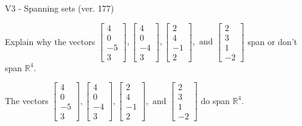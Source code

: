 \begin{exercise}
  \begin{exerciseTitle}V3 - Spanning sets (ver. 177)\end{exerciseTitle}
  \begin{exerciseStatement}
    Explain why the vectors \(\left[\begin{array}{r}
4 \\
0 \\
-5 \\
3
\end{array}\right] , \left[\begin{array}{r}
4 \\
0 \\
-4 \\
3
\end{array}\right] , \left[\begin{array}{r}
2 \\
4 \\
-1 \\
2
\end{array}\right] , \text{ and } \left[\begin{array}{r}
2 \\
3 \\
1 \\
-2
\end{array}\right]\) span or don't span \(\mathbb{R}^4\). 
	


  \end{exerciseStatement}
  \begin{exerciseAnswer}
   The vectors \(\left[\begin{array}{r}
4 \\
0 \\
-5 \\
3
\end{array}\right] , \left[\begin{array}{r}
4 \\
0 \\
-4 \\
3
\end{array}\right] , \left[\begin{array}{r}
2 \\
4 \\
-1 \\
2
\end{array}\right] , \text{ and } \left[\begin{array}{r}
2 \\
3 \\
1 \\
-2
\end{array}\right]\) 
  	 do  
	span \(\mathbb{R}^4\).
  


  \end{exerciseAnswer}
\end{exercise}